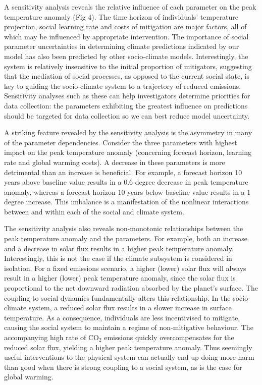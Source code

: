 \documentclass[10pt,letterpaper]{article}
\begin{document}
A sensitivity analysis reveals the relative influence of each parameter on the peak temperature anomaly (Fig 4). The time horizon of individuals' temperature projection, social learning rate and costs of mitigation are major factors, all of which may be influenced by appropriate intervention. The importance of social parameter uncertainties in determining climate predictions indicated by our model has also been predicted by other socio-climate models\cite{beckage18}. Interestingly, the system is relatively insensitive to the initial proportion of mitigators, suggesting that the mediation of social processes, as opposed to the current social state, is key to guiding the socio-climate system to a trajectory of reduced emissions. Sensitivity analyses such as these can help investigators determine priorities for data collection: the parameters exhibiting the greatest influence on predictions should be targeted for data collection so we can best reduce model uncertainty.

A striking feature revealed by the sensitivity analysis is the asymmetry in many of the parameter dependencies. Consider the three parameters with highest impact on the peak temperature anomaly (concerning forecast horizon, learning rate and global warming costs). A decrease in these parameters is more detrimental than an increase is beneficial. For example, a forecast horizon 10 years above baseline value results in a 0.6 degree decrease in peak temperature anomaly, whereas a forecast horizon 10 years below baseline value results in a 1 degree increase. This imbalance is a manifestation of the nonlinear interactions between and within each of the social and climate system.

The sensitivity analysis also reveals non-monotonic relationships between the peak temperature anomaly and the parameters. For example, both an increase and a decrease in solar flux results in a higher peak temperature anomaly. Interestingly, this is not the case if the climate subsystem is considered in isolation. For a fixed emissions scenario, a higher (lower) solar flux will always result in a higher (lower) peak temperature anomaly, since the solar flux is proportional to the net downward radiation absorbed by the planet's surface. The coupling to social dynamics fundamentally alters this relationship. In the socio-climate system, a reduced solar flux results in a slower increase in surface temperature. As a consequence, individuals are less incentivised to mitigate, causing the social system to maintain a regime of non-mitigative behaviour. The accompanying high rate of $\text{CO}_2$ emissions quickly overcompensates for the reduced solar flux, yielding a higher peak temperature anomaly. Thus seemingly useful interventions to the physical system can actually end up doing more harm than good when there is strong coupling to a social system, as is the case for global warming.
\end{document}

